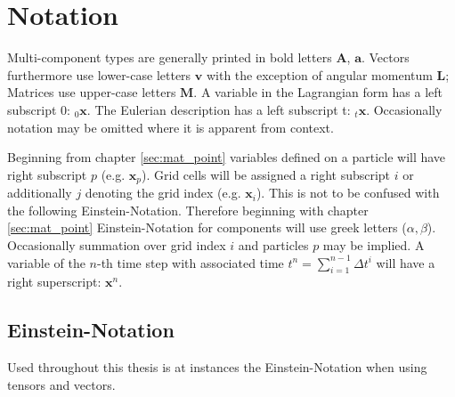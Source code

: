 \documentclass[m,times]{cgMA}
\begin{document}
\section{Notation}\label{sec:notation}
Multi-component types are generally printed in bold letters $\boldsymbol{A}$, $\boldsymbol{a}$. Vectors furthermore use lower-case letters $\boldsymbol{v}$ with the exception of angular momentum $\boldsymbol{L}$; Matrices use upper-case letters $\boldsymbol{M}$. A variable in the Lagrangian form has a left subscript 0: $ _0{\boldsymbol{x}}$. The Eulerian description has a left subscript t: $_t\boldsymbol{x}$. Occasionally notation may be omitted where it is apparent from context.

Beginning from chapter \ref{sec:mat_point} variables defined on a particle will have right subscript $p$ (e.g. $\boldsymbol{x}_p$). Grid cells will be assigned a right subscript $i$ or additionally $j$ denoting the grid index (e.g. $\boldsymbol{x}_i$). This is not to be confused with the following Einstein-Notation. Therefore beginning with chapter \ref{sec:mat_point} Einstein-Notation for components will use greek letters ($\alpha,\beta$). Occasionally summation over grid index $i$ and particles $p$ may be implied. A variable of the $n$-th time step with associated time $t^n = \sum_{i=1}^{n-1} \Delta t^i$ will have a right superscript: $\boldsymbol{x}^n$.
\subsection{Einstein-Notation}
Used throughout this thesis is at instances the Einstein-Notation when using tensors and vectors.
\end{document}
